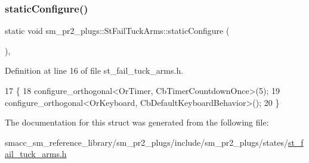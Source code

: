 \subsubsection{\texorpdfstring{static\+Configure()}{staticConfigure()}}
{\footnotesize\ttfamily static void sm\+\_\+pr2\+\_\+plugs\+::\+St\+Fail\+Tuck\+Arms\+::static\+Configure (\begin{DoxyParamCaption}{ }\end{DoxyParamCaption})\hspace{0.3cm}{\ttfamily [inline]}, {\ttfamily [static]}}



Definition at line 16 of file st\+\_\+fail\+\_\+tuck\+\_\+arms.\+h.


\begin{DoxyCode}
17     \{
18         configure\_orthogonal<OrTimer,  CbTimerCountdownOnce>(5);    
19         configure\_orthogonal<OrKeyboard, CbDefaultKeyboardBehavior>();
20     \}
\end{DoxyCode}


The documentation for this struct was generated from the following file\+:\begin{DoxyCompactItemize}
\item 
smacc\+\_\+sm\+\_\+reference\+\_\+library/sm\+\_\+pr2\+\_\+plugs/include/sm\+\_\+pr2\+\_\+plugs/states/\hyperlink{st__fail__tuck__arms_8h}{st\+\_\+fail\+\_\+tuck\+\_\+arms.\+h}\end{DoxyCompactItemize}
